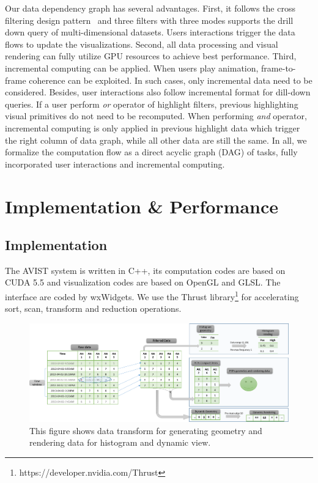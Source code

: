 \documentclass[journal]{vgtc}                %
\begin{document}
{ 
Our data dependency graph has several advantages. First, it follows the cross filtering design pattern~\cite{weaver2010cross} and three filters with three modes supports the drill down query of multi-dimensional datasets. Users interactions trigger the data flows to update the visualizations. Second, all data processing and visual rendering can fully utilize GPU resources to achieve best performance. Third,  incremental computing can be applied. When users play animation, frame-to-frame coherence can be exploited. In such cases, only incremental data need to be considered. Besides, user interactions also follow incremental format for dill-down queries. If a user perform \emph{or} operator of highlight filters, previous highlighting visual primitives do not need to be recomputed. When performing \emph{and} operator, incremental computing is only applied in previous highlight data which trigger the right column of data graph, while all other data are still the same. In all, we formalize the computation flow as a direct acyclic graph (DAG) of tasks, fully incorporated user interactions and incremental computing.
 

\section{Implementation & Performance}
\subsection{Implementation}
The AVIST system is written in C++, its computation codes are based on CUDA 5.5 and visualization codes are based on OpenGL and GLSL. The interface are coded by wxWidgets. We use the Thrust library\footnote{https://developer.nvidia.com/Thrust} for accelerating sort, scan, transform and reduction operations.


\begin{figure}[htb]
	\centering
	\includegraphics[width=1.0\linewidth]{pic/dataTran1.png}
	\parbox[t]{1.0\columnwidth}{\relax
	}
	\caption{\label{fig:dataTran1} This figure shows data transform for generating geometry and rendering data for histogram and dynamic view.}
\end{figure} 

}
\end{document}
